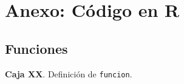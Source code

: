 \section*{Anexo: Código en R}\label{anexo}

\subsection*{Funciones}

\textbf{Caja XX}. Definición de \texttt{funcion}.


